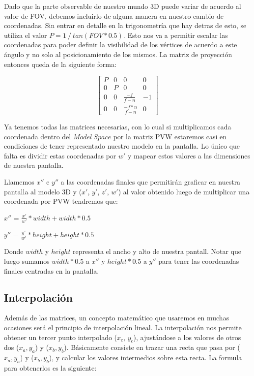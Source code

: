 \documentclass[a4paper]{article}
\begin{document}
Dado que la parte observable de nuestro mundo 3D puede variar de acuerdo al valor de FOV, debemos incluirlo de alguna manera en nuestro cambio de coordenadas. Sin entrar en detalle en la trigonometría que hay detras de esto, se utiliza el valor $P = 1 \ / \ tan(FOV * 0.5)$. Esto nos va a permitir escalar las coordenadas para poder definir la visibilidad de los vértices de acuerdo a este ángulo y no solo al posicionamiento de los mismos.
La matriz de proyección entonces queda de la siguiente forma:


\[
\begin{bmatrix}
P & 0 & 0 & 0 \\
0 & P & 0 & 0 \\
0 & 0 & \frac{-f}{f-n} & -1 \\
0 & 0 & \frac{-f*n}{f-n} & 0  
\end{bmatrix}
\]


Ya tenemos todas las matrices necesarias, con lo cual si multiplicamos cada coordenada dentro del $Model \ Space$ por la matriz PVW estaremos casi en condiciones de tener representado nuestro modelo en la pantalla. Lo único que falta es dividir estas coordenadas por $w'$ y mapear estos valores a las dimensiones de nuestra pantalla.\newline


Llamemos $x''$ e $y''$ a las coordenadas finales que permitirán graficar en nuestra pantalla al modelo 3D y ($x'$, $y'$, $z'$, $w'$) al valor obtenido luego de multiplicar una coordenada por PVW tendremos que: \newline

$x''$ = $\frac{x'}{w'}*width +  width*0.5$ \newline

$y''$ = $\frac{y'}{w'}*height +  height*0.5$ \newline

Donde $width$ y $height$ representa el ancho y alto de nuestra pantall. Notar que luego sumamos $width*0.5$ a $x''$ y $height*0.5$ a $y''$ para tener las coordenadas finales centradas en la pantalla.

\subsection{Interpolación}
Además de las matrices, un concepto matemático que usaremos en muchas ocasiones será el principio de interpolación lineal. La interpolación nos permite obtener un tercer punto interpolado ($x_c$, $y_c$),  ajustándose a los valores de otros dos ($x_a, y_a$) y ($x_b, y_b$). Básicamente consiste en trazar una recta que pasa por ($x_a,y_a$) y ($x_b,y_b$), y calcular los valores intermedios sobre esta recta. La formula para obtenerlos es la siguiente:
\end{document}
